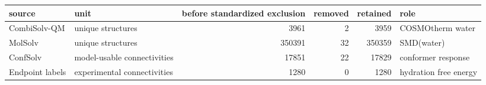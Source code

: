 \begin{tabular}{llrrrp{3.0cm}}
\toprule
source & unit & before standardized exclusion & removed & retained & role \\
\midrule
CombiSolv-QM & unique structures & 3961 & 2 & 3959 & COSMOtherm water \\
MolSolv & unique structures & 350391 & 32 & 350359 & SMD(water) \\
ConfSolv & model-usable connectivities & 17851 & 22 & 17829 & conformer response \\
Endpoint labels & experimental connectivities & 1280 & 0 & 1280 & hydration free energy \\
\bottomrule
\end{tabular}
